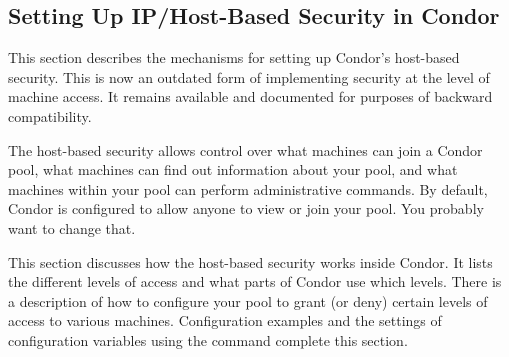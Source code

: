 




\subsection{\label{sec:Host-Security}Setting Up IP/Host-Based Security in
Condor} 

This section describes the mechanisms for setting up Condor's
host-based security.  
This is now an outdated form of implementing security at
the level of machine access. 
It remains available and documented for purposes of backward compatibility.

The host-based security allows control over what machines can
join a Condor pool, what machines can find out information about
your pool, and what machines within your pool can perform
administrative commands.  By default, Condor is configured to allow
anyone to view or join your pool.  You probably want to change that.

This section discusses how the host-based security works inside Condor.
It lists the different levels of access and what
parts of Condor use which levels.
There is a description of how to configure
your pool to grant (or deny) certain levels of access to various
machines.
Configuration examples and the settings of configuration variables
using the  command complete this section.

